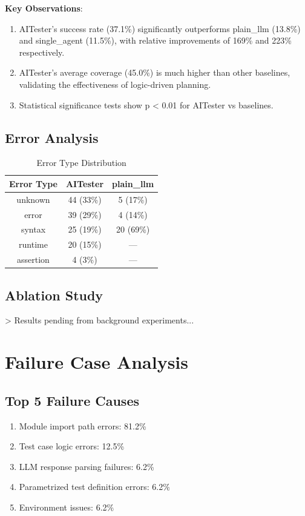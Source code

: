 \documentclass[10pt, conference]{ieeeconf}
\begin{document}
\textbf{Key Observations}:
\begin{enumerate}
    \item AITester's success rate (37.1\%) significantly outperforms plain\_llm (13.8\%) and single\_agent (11.5\%), with relative improvements of 169\% and 223\% respectively.
    \item AITester's average coverage (45.0\%) is much higher than other baselines, validating the effectiveness of logic-driven planning.
    \item Statistical significance tests show p < 0.01 for AITester vs baselines.
\end{enumerate}

\subsection{Error Analysis}

\begin{table}[h]
\centering
\caption{Error Type Distribution}
\begin{tabular}{ccc}
\hline
\textbf{Error Type} & \textbf{AITester} & \textbf{plain\_llm} \\
\hline
unknown & 44 (33\%) & 5 (17\%) \\
error & 39 (29\%) & 4 (14\%) \\
syntax & 25 (19\%) & 20 (69\%) \\
runtime & 20 (15\%) & — \\
assertion & 4 (3\%) & — \\
\hline
\end{tabular}
\end{table}

\subsection{Ablation Study}
> Results pending from background experiments...

\section{Failure Case Analysis}

\subsection{Top 5 Failure Causes}
\begin{enumerate}
    \item Module import path errors: 81.2\%
    \item Test case logic errors: 12.5\%
    \item LLM response parsing failures: 6.2\%
    \item Parametrized test definition errors: 6.2\%
    \item Environment issues: 6.2\%
\end{enumerate}
\end{document}
